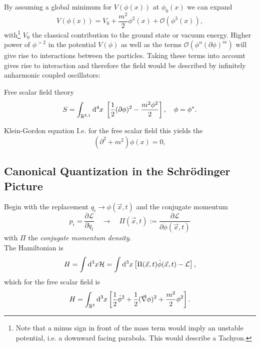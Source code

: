 By assuming a global minimum for $V(\phi(x))$ at $\phi_0(x)$ we can expand 
\begin{equation}
	V(\phi(x)) = V_0 + \frac{m^2}{2} \phi^2(x) + \mathcal{O}(\phi^3(x)),
\end{equation}
with\footnote{Note that a minus sign in front of the mass term would imply an unstable potential, i.e. a downward facing parabola. This would describe a Tachyon.} $V_0$ the classical contribution to the ground state or vacuum energy. Higher power of $\phi^{>2}$ in the potential $V(\phi)$ as well as the terms $\mathcal{O}(\phi^n(\partial \phi)^m)$ will give rise to interactions between the particles. Taking these terms into account gives rise to interaction and therefore the field would be described by infinitely anharmonic coupled oscillators:
\begin{mybox}{Free scalar field theory}
	\begin{equation}
		S = \int_{\mathbb{R}^{3,1}} \mathrm{d}^4x \; \left[\frac{1}{2} (\partial \phi)^2 - \frac{m^2 \phi^2}{2}\right],\quad \phi=\phi^*.
	\end{equation}
\end{mybox}


\begin{mybox}{Klein-Gordon equation}
	I.e. for the free scalar field this yields the
	\begin{equation}	
	(\partial^2+m^2) \phi(x)=0,
	\end{equation}
\end{mybox}


\subsection{Canonical Quantization in the Schrödinger Picture}
Begin with the replacement $q_i \rightarrow \phi(\vec{x},t)$ and the conjugate momentum 
\begin{equation}
	p_i = \frac{\partial \mathcal{L}}{\partial \dot{q}_i} \quad \rightarrow \quad \Pi(\vec{x},t):= \frac{\partial \mathcal{L}}{\partial \dot{\phi}(\vec{x},t)}
\end{equation}
with $\Pi$ the \emph{conjugate momentum density}.\\
The Hamiltonian is
\begin{equation}
	H=\int \mathrm{d}^3x\mathcal{H} =\int \mathrm{d}^3 x \left[\Pi(\vec{x},t) \dot{\phi}(\vec{x},t) - \mathcal{L}\right],
\end{equation}
which for the free scalar field is
\begin{equation}
	H = \int_{\mathbb{R}^3} \mathrm{d}^3 x \left[\frac{1}{2} \dot{\phi}^2 + \frac{1}{2} (\vec{\nabla} \phi)^2+ \frac{m^2}{2} \phi^2 \right].
\end{equation}

